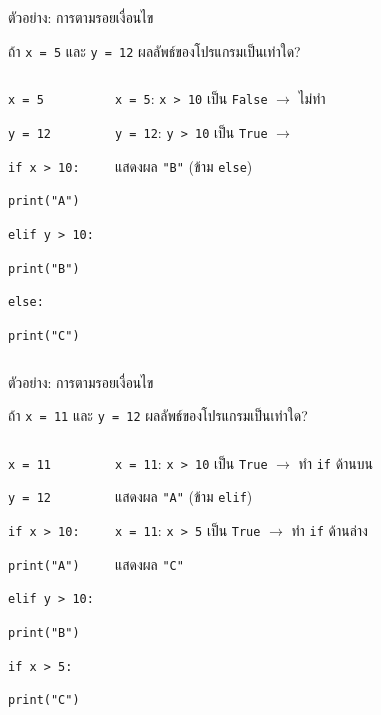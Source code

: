 \documentclass[11pt, aspectratio=169]{beamer}
\newcommand{\py}[1]{\texttt{#1}}
\begin{document}
\begin{frame}{ตัวอย่าง: การตามรอยเงื่อนไข}
  \begin{exambox}[โจทย์]
    ถ้า \py{x = 5} และ \py{y = 12} ผลลัพธ์ของโปรแกรมเป็นเท่าใด?
  \end{exambox}
  \begin{columns}[T]
      \begin{exambox}[โปรแกรม]
        \py{x = 5}

        \py{y = 12}

        \py{if x > 10:}

        \qquad \py{print("A")}

        \py{elif y > 10:}

        \qquad \py{print("B")}

        \py{else:}

        \qquad \py{print("C")}
      \end{exambox}
      \begin{solbox}[วิธีตามรอย]
        \py{x = 5}: \py{x > 10} เป็น \py{False} $\rightarrow$ ไม่ทำ

        \py{y = 12}: \py{y > 10} เป็น \py{True} $\rightarrow$ \highlight{ทำ \py{elif}}

        แสดงผล \py{"B"} \quad (ข้าม \py{else})
      \end{solbox}
  \end{columns}
\end{frame}

\begin{frame}{ตัวอย่าง: การตามรอยเงื่อนไข}
  \begin{exambox}[โจทย์]
    ถ้า \py{x = 11} และ \py{y = 12} ผลลัพธ์ของโปรแกรมเป็นเท่าใด?
  \end{exambox}
  \begin{columns}[T]
      \begin{exambox}[โปรแกรม]
        \py{x = 11}

        \py{y = 12}

        \py{if x > 10:}

        \qquad \py{print("A")}

        \py{elif y > 10:}

        \qquad \py{print("B")}

        \py{if x > 5:}

        \qquad \py{print("C")}
      \end{exambox}
      \begin{solbox}[วิธีตามรอย]
        \py{x = 11}: \py{x > 10} เป็น \py{True} $\rightarrow$ ทำ \py{if} ด้านบน

        แสดงผล \py{"A"} \quad (ข้าม \py{elif})

        \py{x = 11}: \py{x > 5} เป็น \py{True} $\rightarrow$ ทำ \py{if} ด้านล่าง

        แสดงผล \py{"C"}
      \end{solbox}
  \end{columns}
\end{frame}
\end{document}
